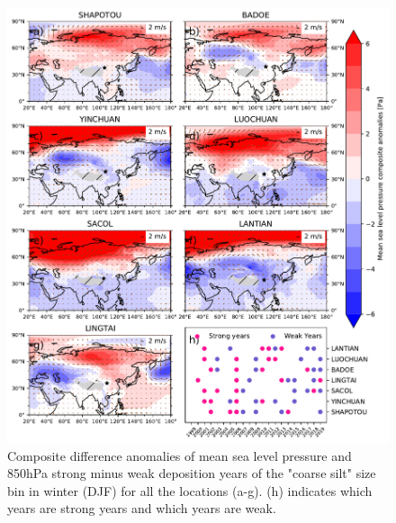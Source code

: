 \begin{figure}[hp]
    \centering
    \includegraphics[width=\textwidth]{texfiles/figs/mslp_850hPa_20micron_DJF.pdf}
    \caption{Composite difference anomalies of mean sea level pressure and 850hPa strong minus weak deposition years of the "coarse silt" size bin in winter (DJF) for all the locations (a-g).  (h) indicates which years are strong years and which years are weak.}
    \label{fig:DJF_850_coarse_composite}
\end{figure}

